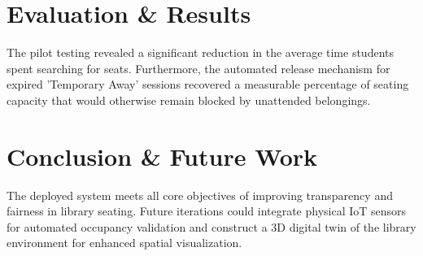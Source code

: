 \documentclass[11pt,a4paper]{article}
\begin{document}
\section{Evaluation \& Results}
The pilot testing revealed a significant reduction in the average time students spent searching for seats. Furthermore, the automated release mechanism for expired 'Temporary Away' sessions recovered a measurable percentage of seating capacity that would otherwise remain blocked by unattended belongings.

\section{Conclusion \& Future Work}
The deployed system meets all core objectives of improving transparency and fairness in library seating. Future iterations could integrate physical IoT sensors for automated occupancy validation and construct a 3D digital twin of the library environment for enhanced spatial visualization.
\end{document}
